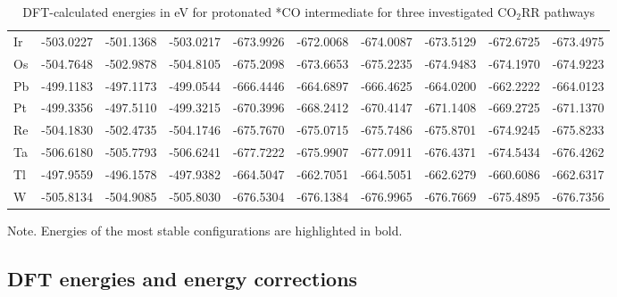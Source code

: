 \begin{table}[h]
{\begin{tabular}{*{10}{l}}
      Ir & -503.0227 & -501.1368 & -503.0217 & -673.9926 & -672.0068 & -674.0087 & -673.5129 & -672.6725 & -673.4975 \\
      Os & -504.7648 & -502.9878 & -504.8105 & -675.2098 & -673.6653 & -675.2235 & -674.9483 & -674.1970 & -674.9223 \\
      Pb & -499.1183 & -497.1173 & -499.0544 & -666.4446 & -664.6897 & -666.4625 & -664.0200 & -662.2222 & -664.0123 \\
      Pt & -499.3356 & -497.5110 & -499.3215 & -670.3996 & -668.2412 & -670.4147 & -671.1408 & -669.2725 & -671.1370 \\
      Re & -504.1830 & -502.4735 & -504.1746 & -675.7670 & -675.0715 & -675.7486 & -675.8701 & -674.9245 & -675.8233 \\
      Ta & -506.6180 & -505.7793 & -506.6241 & -677.7222 & -675.9907 & -677.0911 & -676.4371 & -674.5434 & -676.4262 \\
      Tl & -497.9559 & -496.1578 & -497.9382 & -664.5047 & -662.7051 & -664.5051 & -662.6279 & -660.6086 & -662.6317 \\
      W  & -505.8134 & -504.9085 & -505.8030 & -676.5304 & -676.1384 & -676.9965 & -676.7669 & -675.4895 & -676.7356 \\
  \end{tabular}
  }
  \caption{DFT-calculated energies in eV for protonated *CO intermediate for three investigated CO$_2$RR pathways}
  \label{si_table1}
\end{table}
Note. Energies of the most stable configurations are highlighted in bold.


\subsection{DFT energies and energy corrections}


